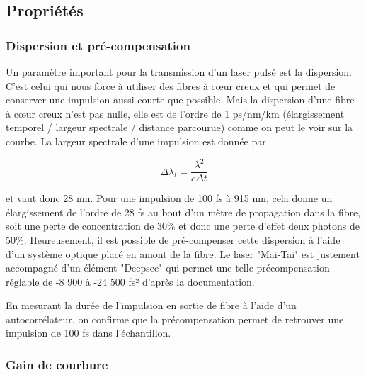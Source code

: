 \subsection{Propriétés}


\subsubsection{Dispersion et pré-compensation}

Un paramètre important pour la transmission d'un laser pulsé est la dispersion. C'est celui qui nous force à utiliser des fibres à cœur creux et qui permet de conserver une impulsion aussi courte que possible. Mais la dispersion d'une fibre à cœur creux n'est pas nulle, elle est de l'ordre de 1 ps/nm/km (élargissement temporel / largeur spectrale / distance parcourue) comme on peut le voir sur la courbe. La largeur spectrale d'une impulsion est donnée par

$$
\Delta \lambda_t = \frac{\lambda^2}{c\Delta t}
$$

et vaut donc 28 nm. Pour une impulsion de 100 fs à 915 nm, cela donne un élargissement de l'ordre de 28 fs au bout d'un mètre de propagation dans la fibre, soit une perte de concentration de 30\% et donc une perte d'effet deux photons de 50\%. Heureusement, il est possible de pré-compenser cette dispersion à l'aide d'un système optique placé en amont de la fibre. Le laser "Mai-Tai" est justement accompagné d'un élément "Deepsee" qui permet une telle précompensation réglable de -8 900 à -24 500 fs² d'après la documentation.


En mesurant la durée de l'impulsion en sortie de fibre à l'aide d'un autocorrélateur, on confirme que la précompensation permet de retrouver une impulsion de 100 fs dans l'échantillon.

\subsubsection{Gain de courbure}


